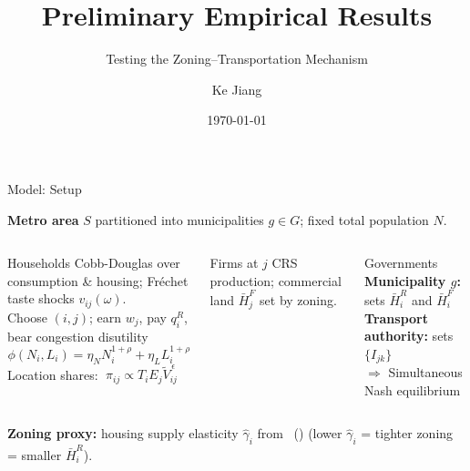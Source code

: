 \documentclass[10pt]{beamer}
\title[Preliminary Results]{Preliminary Empirical Results}
\subtitle{Testing the Zoning--Transportation Mechanism}
\author{Ke Jiang}
\institute{Southern Methodist University}
\date{\today}
\begin{document}
\begin{frame}
  \titlepage
\end{frame}

\begin{frame}{Model: Setup}

\textbf{Metro area} $S$ partitioned into municipalities $g \in G$; fixed total population $N$.

\medskip
\begin{columns}[T]
\begin{block}{Households}
  \small
  Cobb-Douglas over consumption \& housing; Fréchet taste shocks $v_{ij}(\omega)$.\\[4pt]
  Choose $(i,j)$; earn $w_j$, pay $q_i^R$, bear congestion disutility
  \[
    \phi(N_i,L_i) = \eta_N N_i^{1+\rho}+\eta_L L_i^{1+\rho}
  \]
  Location shares: $\;\pi_{ij}\propto T_i E_j\tilde{V}_{ij}^{\,\epsilon}$
\end{block}

\begin{block}{Firms at $j$}
  \small
  CRS production; commercial land $\bar H_j^F$ set by zoning.
\end{block}

\vspace{0.25cm}
\begin{block}{Governments}
  \small
  \textbf{Municipality $g$:} sets $\bar H_i^R$ and $\bar H_i^F$\\[2pt]
  \textbf{Transport authority:} sets $\{I_{jk}\}$\\[2pt]
  $\Rightarrow$ Simultaneous Nash equilibrium
\end{block}
\end{columns}

\medskip
\small
\textbf{Zoning proxy:} housing supply elasticity $\hat\gamma_i$
from \citeauthor{Baum-Snow2024-ii}~(\citeyear{Baum-Snow2024-ii})
(lower $\hat\gamma_i$ = tighter zoning = smaller $\bar H_i^R$).

\end{frame}
\end{document}
